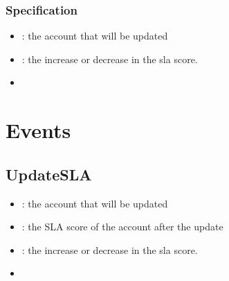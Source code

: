 \documentclass[a4paper,10pt,english]{sphinxmanual}
\begin{document}
\subsubsection{Specification}
\label{\detokenize{spec/sla:id4}}


\begin{itemize}
\item {} 
: the account that will be updated

\item {} 
: the increase or decrease in the sla score.

\end{itemize}

\begin{itemize}
\item {} 

\end{itemize}


\section{Events}
\label{\detokenize{spec/sla:events}}

\subsection{UpdateSLA}
\label{\detokenize{spec/sla:id5}}


\begin{itemize}
\item {} 
: the account that will be updated

\item {} 
: the SLA score of the account after the update

\item {} 
: the increase or decrease in the sla score.

\end{itemize}

\begin{itemize}
\item {} 
{\hyperref[\detokenize{spec/sla:updatesla}]{}}

\end{itemize}
\end{document}
